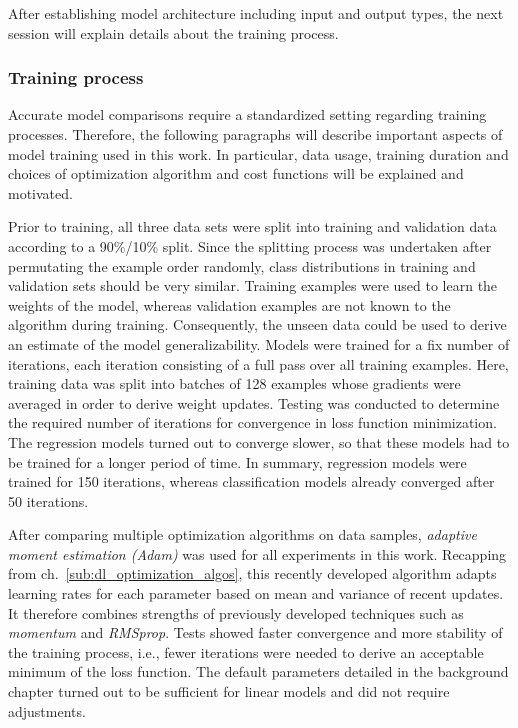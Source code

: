 After establishing model architecture including input and output types, the next
session will explain details about the training process.

\subsubsection{Training process}
\label{sub:lin_training}

Accurate model comparisons require a standardized setting regarding training
processes.
Therefore, the following paragraphs will describe important aspects of model training
used in this work.
In particular, data usage, training duration and choices of optimization
algorithm and cost functions will be explained and motivated.

Prior to training, all three data sets were split into training and validation
data according to a 90\%/10\% split.
Since the splitting process was undertaken after permutating the example order
randomly, class distributions in training and validation sets should be very
similar.
Training examples were used to learn the weights of the model, whereas validation
examples are not known to the algorithm during training.
Consequently, the unseen data could be used to derive an estimate of the model
generalizability.
Models were trained for a fix number of iterations, each iteration consisting
of a full pass over all training examples.
Here, training data was split into batches of 128 examples whose gradients
were averaged in order to derive weight updates.
Testing was conducted to determine the required number of iterations for
convergence in loss function minimization.
The regression models turned out to converge slower, so that these models
had to be trained for a longer period of time.
In summary, regression models were trained for 150 iterations, whereas classification
models already converged after 50 iterations.

After comparing multiple optimization algorithms on data samples, \textit{adaptive
moment estimation (Adam)} was used for all experiments in this work.
Recapping from ch.~\ref{sub:dl_optimization_algos}, this recently developed
algorithm adapts learning rates for each parameter based on mean and variance of
recent updates.
It therefore combines strengths of previously developed techniques such as
\textit{momentum} and \textit{RMSprop}.
Tests showed faster convergence and more stability of the training process, i.e.,
fewer iterations were needed to derive an acceptable minimum of the loss function.
The default parameters detailed in the background chapter turned out to be sufficient
for linear models and did not require adjustments.


